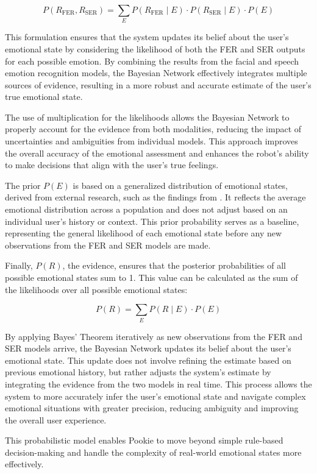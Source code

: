 \[
P(R_{\text{FER}}, R_{\text{SER}}) = \sum_{E} P(R_{\text{FER}} \mid E) \cdot P(R_{\text{SER}} \mid E) \cdot P(E)
\]

This formulation ensures that the system updates its belief about the user's emotional state by considering the likelihood of both the FER and SER outputs for each possible emotion. By combining the results from the facial and speech emotion recognition models, the Bayesian Network effectively integrates multiple sources of evidence, resulting in a more robust and accurate estimate of the user's true emotional state.

The use of multiplication for the likelihoods allows the Bayesian Network to properly account for the evidence from both modalities, reducing the impact of uncertainties and ambiguities from individual models. This approach improves the overall accuracy of the emotional assessment and enhances the robot's ability to make decisions that align with the user's true feelings.

The prior \( P(E) \) is based on a generalized distribution of emotional states, derived from external research, such as the findings from \cite{10.1371/journal.pone.0145450}. It reflects the average emotional distribution across a population and does not adjust based on an individual user’s history or context. This prior probability serves as a baseline, representing the general likelihood of each emotional state before any new observations from the FER and SER models are made.

Finally, \( P(R) \), the evidence, ensures that the posterior probabilities of all possible emotional states sum to 1. This value can be calculated as the sum of the likelihoods over all possible emotional states:

\[
P(R) = \sum_{E} P(R \mid E) \cdot P(E)
\]

By applying Bayes’ Theorem iteratively as new observations from the FER and SER models arrive, the Bayesian Network updates its belief about the user's emotional state. This update does not involve refining the estimate based on previous emotional history, but rather adjusts the system’s estimate by integrating the evidence from the two models in real time. This process allows the system to more accurately infer the user’s emotional state and navigate complex emotional situations with greater precision, reducing ambiguity and improving the overall user experience.

This probabilistic model enables Pookie to move beyond simple rule-based decision-making and handle the complexity of real-world emotional states more effectively.
